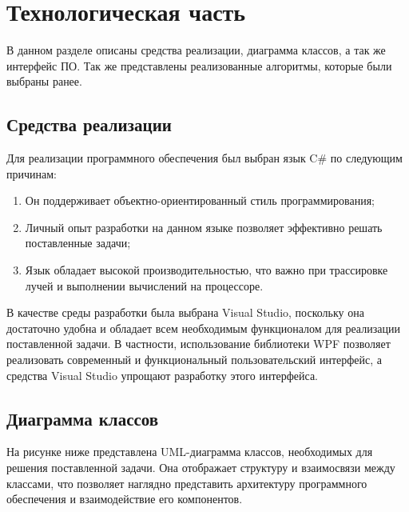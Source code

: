 \chapter{Технологическая часть}

В данном разделе описаны средства реализации, диаграмма классов, а так же интерфейс ПО. Так же представлены реализованные алгоритмы, которые были выбраны ранее.

\section{Средства реализации}
Для реализации программного обеспечения был выбран язык C\# по следующим причинам:
\begin{enumerate}
	\item Он поддерживает объектно-ориентированный стиль программирования;
	\item Личный опыт разработки на данном языке позволяет эффективно решать поставленные задачи;
	\item Язык обладает высокой производительностью, что важно при трассировке лучей и выполнении вычислений на процессоре.
\end{enumerate}

В качестве среды разработки была выбрана Visual Studio, поскольку она достаточно удобна и обладает всем необходимым функционалом для реализации поставленной задачи. В частности, использование библиотеки WPF позволяет реализовать современный и функциональный пользовательский интерфейс, а средства Visual Studio упрощают разработку этого интерфейса.

\section{Диаграмма классов}
На рисунке ниже представлена UML-диаграмма классов, необходимых для решения поставленной задачи. Она отображает структуру и взаимосвязи между  классами, что позволяет наглядно представить архитектуру программного обеспечения и взаимодействие его компонентов.

